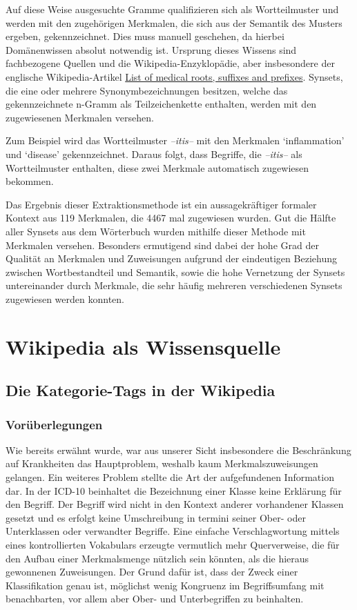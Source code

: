 \documentclass[pagesize,DIV=calc,12pt,draft]{scrreprt}
\begin{document}
Auf diese Weise ausgesuchte Gramme qualifizieren sich als Wortteilmuster
und werden mit den zugehörigen Merkmalen, die sich aus der Semantik des
Musters ergeben, gekennzeichnet. Dies muss manuell geschehen, da hierbei
Domänenwissen absolut notwendig ist. Ursprung dieses Wissens sind
fachbezogene Quellen und die Wikipedia-Enzyklopädie, aber insbesondere
der englische Wikipedia-Artikel
\href{http://en.wikipedia.org/wiki/List_of_medical_roots,_suffixes_and_prefixes}{List
of medical roots, suffixes and prefixes}. Synsets, die eine oder mehrere
Synonymbezeichnungen besitzen, welche das gekennzeichnete n-Gramm als
Teilzeichenkette enthalten, werden mit den zugewiesenen Merkmalen
versehen.

Zum Beispiel wird das Wortteilmuster \emph{--itis--} mit den Merkmalen
`inflammation' und `disease' gekennzeichnet. Daraus folgt, dass
Begriffe, die \emph{--itis--} als Wortteilmuster enthalten, diese zwei Merkmale
automatisch zugewiesen bekommen.

Das Ergebnis dieser Extraktionsmethode ist ein aussagekräftiger formaler
Kontext aus 119 Merkmalen, die 4467 mal zugewiesen wurden. Gut die
Hälfte aller Synsets aus dem Wörterbuch wurden mithilfe dieser Methode
mit Merkmalen versehen. Besonders ermutigend sind dabei der hohe Grad
der Qualität an Merkmalen und Zuweisungen aufgrund der eindeutigen
Beziehung zwischen Wortbestandteil und Semantik, sowie die hohe
Vernetzung der Synsets untereinander durch Merkmale, die sehr häufig
mehreren verschiedenen Synsets zugewiesen werden konnten.

\section{Wikipedia als Wissensquelle}

\subsection{Die Kategorie-Tags in der Wikipedia}

\subsubsection{Vorüberlegungen}

Wie bereits erwähnt wurde, war aus unserer Sicht insbesondere die
Beschränkung auf Krankheiten das Hauptproblem, weshalb kaum
Merkmalszuweisungen gelangen. Ein weiteres Problem stellte die Art der
aufgefundenen Information dar. In der ICD-10 beinhaltet die Bezeichnung
einer Klasse keine Erklärung für den Begriff. Der Begriff wird nicht in
den Kontext anderer vorhandener Klassen gesetzt und es erfolgt keine
Umschreibung in termini seiner Ober- oder Unterklassen oder verwandter
Begriffe. Eine einfache Verschlagwortung mittels eines kontrollierten
Vokabulars erzeugte vermutlich mehr Querverweise, die für den Aufbau
einer Merkmalsmenge nützlich sein könnten, als die hieraus gewonnenen
Zuweisungen. Der Grund dafür ist, dass der Zweck einer Klassifikation
genau ist, möglichst wenig Kongruenz im Begriffsumfang mit benachbarten,
vor allem aber Ober- und Unterbegriffen zu beinhalten.
\end{document}
